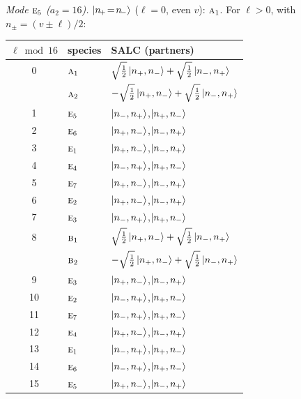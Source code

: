 \documentclass[11pt]{article}
\newcommand{\irr}[1]{\text{\normalfont\scshape #1}}
\begin{document}
\emph{Mode $\irr{e}_{5}$ ($a_2=16$).} $\ket{n_{\!+}\!=\!n_{\!-}}$ ($\ell=0$, even $v$): $\irr{a}_{1}$. For $\ell>0$, with $n_\pm=(v\pm\ell)/2$:
\begin{longtable}{c l l}\hline $\ell\bmod 16$ & species & SALC (partners)\\ \hline\endhead
0 & $\irr{a}_{1}$ & $\sqrt{\tfrac{1}{2}}\ket{n_+,n_-}+\sqrt{\tfrac{1}{2}}\ket{n_-,n_+}$\\
 & $\irr{a}_{2}$ & $-\sqrt{\tfrac{1}{2}}\ket{n_+,n_-}+\sqrt{\tfrac{1}{2}}\ket{n_-,n_+}$\\
1 & $\irr{e}_{5}$ & $\ket{n_-,n_+}$,\quad $\ket{n_+,n_-}$\\
2 & $\irr{e}_{6}$ & $\ket{n_+,n_-}$,\quad $\ket{n_-,n_+}$\\
3 & $\irr{e}_{1}$ & $\ket{n_+,n_-}$,\quad $\ket{n_-,n_+}$\\
4 & $\irr{e}_{4}$ & $\ket{n_-,n_+}$,\quad $\ket{n_+,n_-}$\\
5 & $\irr{e}_{7}$ & $\ket{n_+,n_-}$,\quad $\ket{n_-,n_+}$\\
6 & $\irr{e}_{2}$ & $\ket{n_+,n_-}$,\quad $\ket{n_-,n_+}$\\
7 & $\irr{e}_{3}$ & $\ket{n_-,n_+}$,\quad $\ket{n_+,n_-}$\\
8 & $\irr{b}_{1}$ & $\sqrt{\tfrac{1}{2}}\ket{n_+,n_-}+\sqrt{\tfrac{1}{2}}\ket{n_-,n_+}$\\
 & $\irr{b}_{2}$ & $-\sqrt{\tfrac{1}{2}}\ket{n_+,n_-}+\sqrt{\tfrac{1}{2}}\ket{n_-,n_+}$\\
9 & $\irr{e}_{3}$ & $\ket{n_+,n_-}$,\quad $\ket{n_-,n_+}$\\
10 & $\irr{e}_{2}$ & $\ket{n_-,n_+}$,\quad $\ket{n_+,n_-}$\\
11 & $\irr{e}_{7}$ & $\ket{n_-,n_+}$,\quad $\ket{n_+,n_-}$\\
12 & $\irr{e}_{4}$ & $\ket{n_+,n_-}$,\quad $\ket{n_-,n_+}$\\
13 & $\irr{e}_{1}$ & $\ket{n_-,n_+}$,\quad $\ket{n_+,n_-}$\\
14 & $\irr{e}_{6}$ & $\ket{n_-,n_+}$,\quad $\ket{n_+,n_-}$\\
15 & $\irr{e}_{5}$ & $\ket{n_+,n_-}$,\quad $\ket{n_-,n_+}$\\
\hline\end{longtable}
\end{document}
